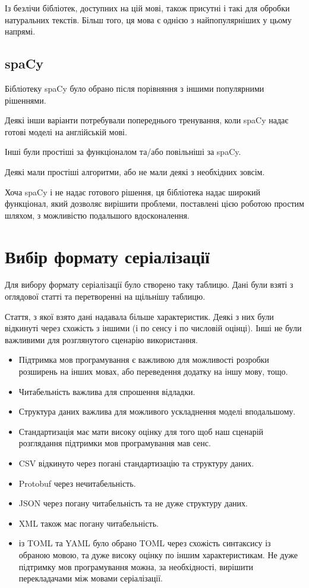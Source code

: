 \documentclass{article}
\let\oldsection\section
\renewcommand{\section}{\clearpage\oldsection}
\begin{document}
Із безлічи бібліотек, доступних на цій мові, також присутні
і такі для обробки натуральних текстів. Більш того, ця мова є однією з
найпопулярніших у цьому напрямі.

\subsection{spaCy}

Бібліотеку spaCy було обрано після порівняння з іншими популярними рішеннями.

Деякі інши варіанти потребували попереднього тренування, коли spaCy надає
готові моделі на англійській мові.

Інші були простіші за функціоналом та/або повільніші за spaCy.

Деякі мали простіші алгоритми, або не мали деякі з необхідних зовсім.

Хоча spaCy і не надає готового рішення,
ця бібліотека надає широкий функціонал, який дозволяє вирішити проблеми,
поставлені цією роботою простим шляхом, з можливістю подальшого вдосконалення.

\section{Вибір формату серіалізації}
Для вибору формату серіалізації було створено таку таблицю.
Дані були взяті з оглядової статті та перетворенні на щільнішу таблицю.

Стаття, з якої взято дані надавала більше характеристик.
Деякі з них були відкинуті через схожість з іншими (і по сенсу і по числовій оцінці).
Інші не були важливими для розглянутого сценарію використання.

\begin{itemize}
\item Підтримка мов програмування є важливою для можливості розробки розширень
  на інших мовах, або переведення додатку на іншу мову, тощо.
\item Читабельність важлива для спрошення відладки.
\item Структура даних важлива для можливого ускладнення моделі вподальшому.
\item Стандартизація має мати високу оцінку для того щоб наш сценарій
  розглядання підтримки мов програмування мав сенс.
\end{itemize}

\hrulefill

\begin{itemize}
	\item CSV відкинуто через погані стандартизацію та структуру даних.
	\item Protobuf через нечитабельність.
	\item JSON через погану читабельність та не дуже структуру даних.
	\item XML також має погану читабельність.
	\item із TOML та YAML було обрано TOML через схожість синтаксису із обраною мовою,
	та дуже високу оцінку по іншим характеристикам.
	Не дуже підтримку мов програмування можна, за необхідності,
	вирішити перекладачами між мовами серіалізації.
\end{itemize}
\end{document}
